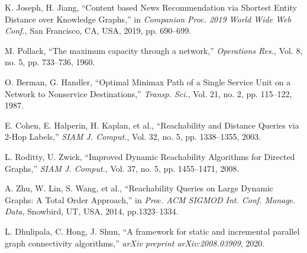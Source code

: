 \documentclass[lettersize,journal]{IEEEtran}
\begin{document}
\begin{thebibliography}{100}
K. Joseph, H. Jiang, ``Content based News Recommendation via Shortest Entity Distance over Knowledge Graphs,'' in \textit{Companion Proc. 2019 World Wide Web Conf.}, San Francisco, CA, USA, 2019, pp. 690--699.

M. Pollack, ``The maximum capacity through a network,'' \textit{Operations Res.}, Vol. 8, no. 5, pp. 733--736, 1960.

O. Berman, G. Handler, ``Optimal Minimax Path of a Single Service Unit on a Network to Nonservice Destinations,'' \textit{Transp. Sci.}, Vol. 21, no. 2, pp. 115--122, 1987.

E. Cohen, E. Halperin, H. Kaplan, et al., ``Reachability and Distance Queries via 2-Hop Labels,'' \textit{SIAM J. Comput.}, Vol. 32, no. 5, pp. 1338--1355, 2003.

L. Roditty, U. Zwick, ``Improved Dynamic Reachability Algorithms for Directed Graphs,'' \textit{SIAM J. Comput.}, Vol. 37, no. 5, pp. 1455--1471, 2008.

A. Zhu, W. Lin, S. Wang, et al., ``Reachability Queries on Large Dynamic Graphs: A Total Order Approach,'' in \textit{Proc. ACM SIGMOD Int. Conf. Manage. Data}, Snowbird, UT, USA, 2014, pp.1323--1334.

L. Dhulipala, C. Hong, J. Shun, ``A framework for static and incremental parallel graph connectivity algorithms,'' \textit{arXiv preprint arXiv:2008.03909}, 2020.


\end{thebibliography}
\end{document}
